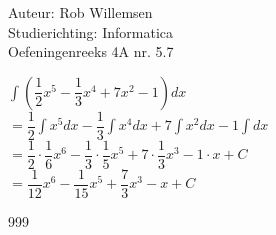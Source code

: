 \documentclass[a4paper]{article}
\newcommand{\dint}{\displaystyle\int}
\begin{document}
\noindent \large Auteur: Rob Willemsen \\
\noindent \large Studierichting: Informatica \\
\noindent \large Oefeningenreeks 4A nr. 5.7 \\

\medskip

\normalsize

$\dint \left(\dfrac{1}{2}x^5 - \dfrac{1}{3}x^4 + 7x^2 - 1\right) dx$ \\

$= \dfrac{1}{2} \dint x^5 dx - \dfrac{1}{3} \dint x^4 dx + 7 \dint x^2 dx - 1 \dint dx$ \\

$= \dfrac{1}{2} \cdot \dfrac{1}{6}x^6 - \dfrac{1}{3} \cdot \dfrac{1}{5}x^5 + 7 \cdot \dfrac{1}{3}x^3 - 1 \cdot x + C$ \\

$= \dfrac{1}{12}x^6 - \dfrac{1}{15}x^5 + \dfrac{7}{3}x^3 - x + C$ \\

\begin{thebibliography}{999}
\end{thebibliography}
\end{document}
